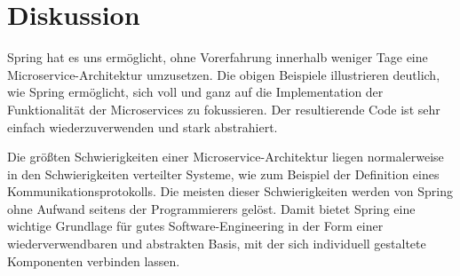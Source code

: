 \documentclass{article}
\begin{document}
\section{Diskussion}

Spring hat es uns ermöglicht, ohne Vorerfahrung innerhalb weniger Tage eine Microservice-Architektur umzusetzen.
Die obigen Beispiele illustrieren deutlich, wie Spring ermöglicht, sich voll und ganz auf die Implementation der Funktionalität der Microservices zu fokussieren.
Der resultierende Code ist sehr einfach wiederzuverwenden und stark abstrahiert.

Die größten Schwierigkeiten einer Microservice-Architektur liegen normalerweise in den Schwierigkeiten verteilter Systeme, wie zum Beispiel der Definition eines Kommunikationsprotokolls.
Die meisten dieser Schwierigkeiten werden von Spring ohne Aufwand seitens der Programmierers gelöst.
Damit bietet Spring eine wichtige Grundlage für gutes Software-Engineering in der Form einer wiederverwendbaren und abstrakten Basis, mit der sich individuell gestaltete Komponenten verbinden lassen.
\end{document}
